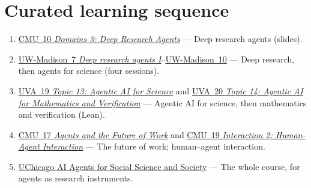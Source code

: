 \documentclass[10pt,oneside]{report}
\begin{document}
\section{Curated learning sequence}
\begin{enumerate}
\item \hyperlink{lec-CMU-10}{CMU~10 \emph{Domains 3: Deep Research Agents}} --- Deep research agents (slides).
\item \hyperlink{lec-UW-7}{UW-Madison~7 \emph{Deep research agents I}}--\hyperlink{lec-UW-10}{UW-Madison~10} --- Deep research, then agents for science (four sessions).
\item \hyperlink{lec-UVA-19}{UVA~19 \emph{Topic 13: Agentic AI for Science}} and \hyperlink{lec-UVA-20}{UVA~20 \emph{Topic 14: Agentic AI for Mathematics and Verification}} --- Agentic AI for science, then mathematics and verification (Lean).
\item \hyperlink{lec-CMU-17}{CMU~17 \emph{Agents and the Future of Work}} and \hyperlink{lec-CMU-19}{CMU~19 \emph{Interaction 2: Human-Agent Interaction}} --- The future of work; human--agent interaction.
\item \hyperlink{course-UCHI}{UChicago AI Agents for Social Science and Society} --- The whole course, for agents as research instruments.
\end{enumerate}
\end{document}
